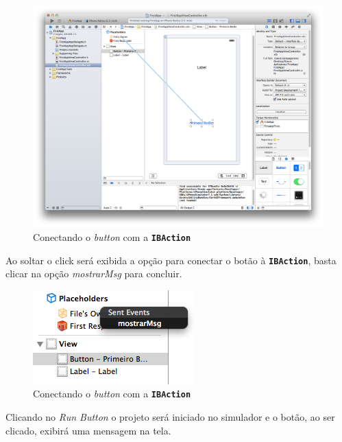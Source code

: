 \documentclass[a4paper,12pt,brazil,doubleside]{book}
\begin{document}
\begin{singlespace}
\begin{figure}[H]
  \centering
  \includegraphics[width=.99\textwidth]{figuras/3/tela_novo_projeto_23.png}
  \caption{Conectando o \emph{button} com a \texttt{\textbf{IBAction}}}
  \label{fig:a}
\end{figure}


Ao soltar o click será exibida a opção para conectar o botão à \texttt{\textbf{IBAction}}, basta clicar na opção \emph{mostrarMsg} para concluir.

\begin{figure}[H]
  \centering
  \includegraphics[scale=1]{figuras/3/tela_novo_projeto_24.png}
  \caption{Conectando o \emph{button} com a \texttt{\textbf{IBAction}}}
  \label{fig:a}
\end{figure}


Clicando no \emph{Run Button} o projeto será iniciado no simulador e o botão, ao ser clicado, exibirá uma mensagem na tela.


\end{singlespace}
\end{document}
